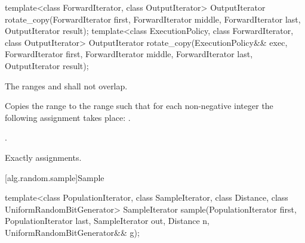 %
\begin{itemdecl}
template<class ForwardIterator, class OutputIterator>
  OutputIterator
    rotate_copy(ForwardIterator first, ForwardIterator middle, ForwardIterator last,
                OutputIterator result);
template<class ExecutionPolicy, class ForwardIterator, class OutputIterator>
  OutputIterator
    rotate_copy(ExecutionPolicy&& exec,
                ForwardIterator first, ForwardIterator middle, ForwardIterator last,
                OutputIterator result);
\end{itemdecl}

\begin{itemdescr}
\pnum
\requires
The ranges
and
shall not overlap.

\pnum
\effects
Copies the range
to the range
such that for each non-negative integer
the following assignment takes place:
.

\pnum
\returns
{}.

\pnum
\complexity
Exactly
assignments.
\end{itemdescr}

[alg.random.sample]{Sample}

%
\begin{itemdecl}
template<class PopulationIterator, class SampleIterator,
         class Distance, class UniformRandomBitGenerator>
  SampleIterator sample(PopulationIterator first, PopulationIterator last,
                        SampleIterator out, Distance n,
                        UniformRandomBitGenerator&& g);
\end{itemdecl}

